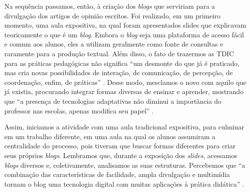 \documentclass{textolivre}
\begin{document}
Na sequência passamos, então, à criação dos \emph{blogs} que serviriam para a divulgação dos artigos de opinião escritos. Foi realizado, em um primeiro momento, uma aula expositiva, na qual foram apresentados slides que explicavam teoricamente o que é um \emph{blog}. Embora o \emph{blog} seja uma plataforma de acesso fácil e comum aos alunos, eles a utilizam geralmente como fonte de consultas e raramente para a produção textual. Além disso, o fato de trazermos as TDIC para as práticas pedagógicas não significa “um desmonte do que já é praticado, mas cria novas possibilidades de interação, de comunicação, de percepção, de coordenação, enfim, de práticas” \cite[p.~104]{gomes2015}. Desse modo, mesclamos o novo com aquilo que já existia, procurando integrar formas diversas de ensinar e aprender, mostrando que “a presença de tecnologias adaptativas não diminui a importância do professor nas escolas, apenas modifica seu papel” \cite[p.~91]{bacich2015}.

Assim, iniciamos a atividade com uma aula tradicional expositiva, para culminar em um trabalho diferente, em uma aula na qual os alunos assumiram a centralidade do processo, pois tiveram que buscar formas diferentes para criar seus próprios \emph{blogs}. Lembramos que, durante a exposição dos \emph{slides}, acessamos \emph{blogs} diversos e, coletivamente, analisamos as suas estruturas. Percebemos que “a combinação das características de facilidade, ampla divulgação e multimídia tornam o blog uma tecnologia digital com muitas aplicações à prática didática” \cite[p.~98]{gomes2015}.
\end{document}
